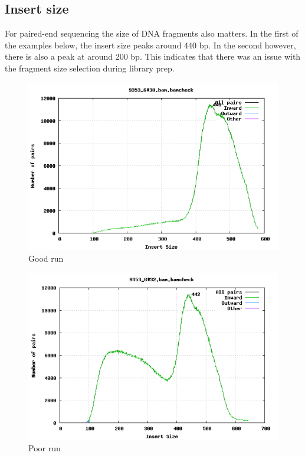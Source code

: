 \documentclass[11pt]{article}
\makeatletter
\def\maxwidth{\ifdim\Gin@nat@width>\linewidth\linewidth
    \else\Gin@nat@width\fi}
\let\Oldincludegraphics\includegraphics
\renewcommand{\includegraphics}[1]{\Oldincludegraphics[width=.8\maxwidth, height=.55\textheight, keepaspectratio]{#1}}
\makeatother
\begin{document}
    \hypertarget{insert-size}{%
\subsection{Insert size}\label{insert-size}}

For paired-end sequencing the size of DNA fragments also matters. In the
first of the examples below, the insert size peaks around 440 bp. In the
second however, there is also a peak at around 200 bp. This indicates
that there was an issue with the fragment size selection during library
prep.

    \begin{figure}[H]
\centering
\includegraphics{img/insert_size_pass.png}
\caption{Good run}
\end{figure}

    \begin{figure}[H]
\centering
\includegraphics{img/insert_size_fail.png}
\caption{Poor run}
\end{figure}
\end{document}
